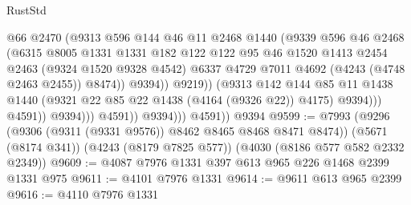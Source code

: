 \begin{lexlean}{RustStd}
\begin{coremodule}
                                      @66
                                      @2470
                                      (@9313
                                        @596
                                        @144
                                        @46
                                        @11
                                        @2468
                                        @1440
                                        (@9339
                                          @596
                                          @46
                                          @2468
                                          (@6315
                                            @8005
                                            @1331
                                            @1331
                                            @182
                                            @122
                                            @122
                                            @95
                                            @46
                                            @1520
                                            @1413
                                            @2454
                                            @2463
                                            (@9324 @1520 @9328 @4542)
                                            @6337
                                            @4729
                                            @7011
                                            @4692
                                            (@4243 (@4748 @2463 @2455))
                                            @8474))
                                        @9394))
                                    @9219))
                                (@9313
                                  @142
                                  @144
                                  @85
                                  @11
                                  @1438
                                  @1440
                                  (@9321 @22 @85 @22 @1438 (@4164 (@9326 @22)) @4175)
                                  @9394)))
                            @4591))
                        @9394)))
                  @4591))
              @9394)))
        @4591))
    @9394
@9599 := @7993
    (@9296 (@9306 (@9311 (@9331 @9576)) @8462 @8465 @8468 @8471 @8474))
    (@5671 (@8174 @341))
    (@4243 (@8179 @7825 @577))
    (@4030 (@8186 @577 @582 @2332 @2349))
@9609 := @4087 @7976 @1331 @397 @613 @965 @226 @1468 @2399 @1331 @975
@9611 := @4101 @7976 @1331
@9614 := @9611 @613 @965 @2399
@9616 := @4110 @7976 @1331

\end{coremodule}
\end{lexlean}
